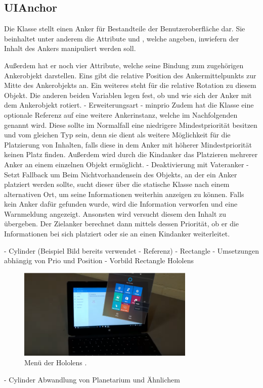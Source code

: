 		\subsection{UIAnchor}
			Die Klasse  stellt einen Anker für Bestandteile der Benutzeroberfläche dar. Sie beinhaltet unter anderem die Attribute  und , welche angeben, inwiefern der Inhalt des Ankers manipuliert werden soll. 
			
			Außerdem hat er noch vier Attribute, welche seine Bindung zum zugehörigen Ankerobjekt darstellen. Eins gibt die relative Position des Ankermittelpunkts zur Mitte des Ankerobjekts an. Ein weiteres steht für die relative Rotation zu diesem Objekt. Die anderen beiden Variablen legen fest, ob und wie sich der Anker mit dem Ankerobjekt rotiert. 
			- Erweiterungsart
			- minprio
			Zudem hat die Klasse eine optionale Referenz auf eine weitere Ankerinstanz, welche im Nachfolgenden  genannt wird. Diese sollte im Normalfall eine niedrigere Mindestpriorität besitzen und vom gleichen Typ sein, denn sie dient als weitere Möglichkeit für die Platzierung von Inhalten, falls diese in dem Anker mit höherer Mindestpriorität keinen Platz finden. Außerdem wird durch die Kindanker das Platzieren mehrerer Anker an einem einzelnen Objekt ermöglicht. - Deaktivierung mit Vateranker
			- Setzt Fallback um
			Beim Nichtvorhandensein des Objekts, an der ein Anker platziert werden sollte, sucht dieser über die statische Klasse  nach einem alternativen Ort, um seine Informationen weiterhin anzeigen zu können.
			Falls kein Anker dafür gefunden wurde, wird die Information verworfen und eine Warnmeldung angezeigt. Ansonsten wird versucht diesem den Inhalt zu übergeben. Der Zielanker berechnet dann mittels dessen Priorität, ob er die Informationen bei sich platziert oder sie an einen Kindanker weiterleitet.
			
			- Cylinder (Beispiel Bild bereits verwendet - Referenz)
			- Rectangle 
			- Umsetzungen abhängig von Prio und Position
			- Vorbild Rectangle Hololens
			\begin{figure}[htbp]
				\centering
				\includegraphics[width=0.75\textwidth]{figures/HololensMain.png}
				\caption{Menü der Hololens .}
				\label{fig:hololensMain}
			\end{figure}
			- Cylinder Abwandlung von Planetarium und Ähnlichem
		
